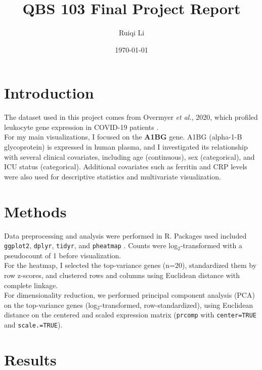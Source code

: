 \documentclass[11pt]{article}
\title{QBS 103 Final Project Report}
\author{Ruiqi Li}
\date{\today}
\begin{document}
\maketitle

\section{Introduction}
The dataset used in this project comes from Overmyer \textit{et al.}, 2020, which profiled leukocyte gene expression in COVID-19 patients \citep{overmyer_large-scale_2021}. \\
For my main visualizations, I focused on the \textbf{A1BG} gene. A1BG (alpha-1-B glycoprotein) is expressed in human plasma, and I investigated its relationship with several clinical covariates, including age (continuous), sex (categorical), and ICU status (categorical). Additional covariates such as ferritin and CRP levels were also used for descriptive statistics and multivariate visualization. 

\section{Methods}
Data preprocessing and analysis were performed in R. Packages used included \texttt{ggplot2}, \texttt{dplyr}, \texttt{tidyr}, and \texttt{pheatmap} \citep{ggplot22016,dplyr2023,R-tidyr,pheatmap2019}. 
Counts were log$_2$-transformed with a pseudocount of 1 before visualization. \\
For the heatmap, I selected the top-variance genes (n=20), standardized them by row z-scores, and clustered rows and columns using Euclidean distance with complete linkage.\\
For dimensionality reduction, we performed principal component analysis (PCA) on the top-variance genes (log$_2$-transformed, row-standardized), using Euclidean distance on the centered and scaled expression matrix (\texttt{prcomp} with \verb|center=TRUE| and \verb|scale.=TRUE|).

\section{Results}
\end{document}
